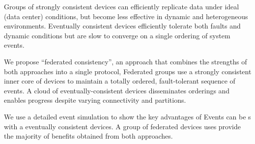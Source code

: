 Groups of strongly consistent devices can efficiently replicate data under
ideal (data center) conditions, but become less effective in dynamic and
heterogeneous environments.
Eventually consistent devices efficiently tolerate both faults and dynamic
conditions but are slow to converge on a single ordering of system events.

We propose ``federated consistency'', an approach that combines the strengths
of both approaches into a single protocol, Federated groups use a strongly
consistent inner core of devices to maintain a totally ordered, fault-tolerant
sequence of events.
A cloud of eventually-consistent devices disseminates orderings and enables
progress despite varying connectivity and partitions.

We use a detailed event simulation to show the key advantages of 
Events
can be s with a 
eventually consistent devices.
A group of federated devices uses provide the majority of benefits
obtained from both approaches. 
